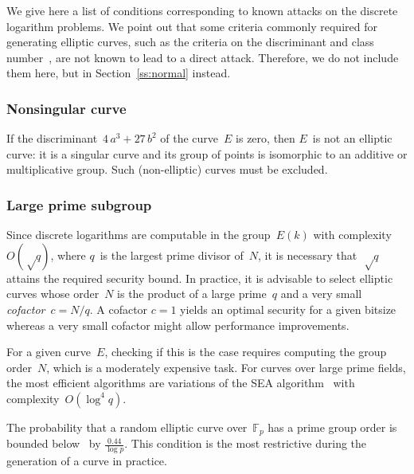 \documentclass[twocolumn,letterpaper,10pt]{article}
\def\F{\mathbb{F}}
\begin{document}
We give here a list of conditions corresponding to
known attacks on the discrete logarithm problems.
We point out that some criteria commonly required
for generating elliptic curves,
such as the criteria on the discriminant and class number~\cite{rfc5639},
are not known to lead to a direct attack.
Therefore, we do not include them here,
but in Section~\ref{ss:normal} instead.


\subsubsection{Nonsingular curve}
\label{sss:singular}

If the discriminant~$4\, a^3 + 27\,b^2$
of the curve~$E$ is zero, then $E$~is not an elliptic curve:
it is a singular curve and its group of points is isomorphic to
an additive or multiplicative group.
Such (non-elliptic) curves must be excluded.

\subsubsection{Large prime subgroup}
\label{sss:prime}

Since discrete logarithms are computable in the group~$E(k)$
with complexity~$O(√q)$, where $q$~is the largest prime divisor of~$N$,
it is necessary that~$√q$ attains the required security bound.
In practice, it is advisable to select elliptic curves whose order~$N$
is the product of a large prime~$q$
and a very small \emph{cofactor}~$c = N/q$.
A cofactor $c = 1$ yields an optimal security for a given bitsize
whereas a very small cofactor might allow performance improvements.

For a given curve~$E$, checking if this is the case
requires computing the group order~$N$,
which is a moderately expensive task.
For curves over large prime fields,
the most efficient algorithms are variations
of the SEA algorithm~\cite{mc1985schoof,
jtnb1995schoof,smf2008cl} with complexity~$O(\log^4q)$.

The probability that a random elliptic curve over~$\F_p$
has a prime group order is bounded below~\cite{lms2000gm}
by $\frac{0.44}{\log p}$.
This condition is the most restrictive during the generation
of a curve in practice.
\end{document}
